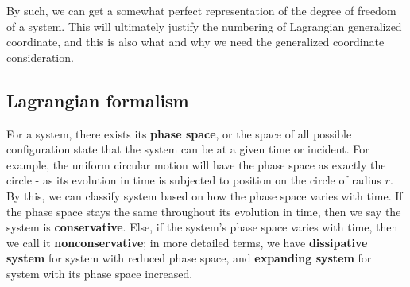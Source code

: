 By such, we can get a somewhat perfect representation of the degree of freedom of a system. This will ultimately justify the numbering of Lagrangian generalized coordinate, and this is also what and why we need the generalized coordinate consideration. 

\subsection{Lagrangian formalism}

For a system, there exists its \textbf{phase space}, or the space of all possible configuration state that the system can be at a given time or incident. For example, the uniform circular motion will have the phase space as exactly the circle - as its evolution in time is subjected to position on the circle of radius $r$. By this, we can classify system based on how the phase space varies with time. If the phase space stays the same throughout its evolution in time, then we say the system is \textbf{conservative}. Else, if the system's phase space varies with time, then we call it \textbf{nonconservative}; in more detailed terms, we have \textbf{dissipative system}  for system with reduced phase space, and \textbf{expanding system} for system with its phase space increased. 

